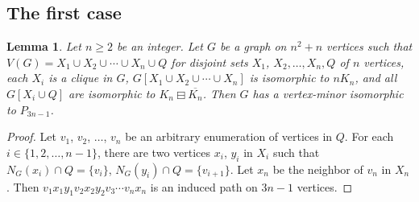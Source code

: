 \documentclass[11pt]{article}
\newtheorem{lemma}[theorem]{Lemma}
\newcommand\mat{\boxminus}
\def\S_#1{\overline{K_{#1}}}
\begin{document}
      \subsection{The first case}\label{subsec:starmatching}
      \begin{lemma}\label{lem:first1}
        Let $n\ge 2$ be an integer.
        Let $G$ be a graph on $n^2+n$ vertices such that 
        $V(G)=X_1\cup X_2\cup\cdots \cup X_n\cup Q$
        for disjoint sets $X_1$, $X_2,\ldots, X_n,Q$ of $n$ vertices,
        each $X_i$ is a clique in $G$,
        $G[X_1\cup X_2\cup \cdots \cup X_n]$ is isomorphic to $nK_n$,
        and all $G[X_i\cup Q]$ are isomorphic to  $K_n\mat \S_n$.
        Then $G$ has a vertex-minor isomorphic to $P_{3n-1}$.
      \end{lemma}
      \begin{proof}
        Let $v_1$, $v_2$, $\ldots$, $v_n$ be an arbitrary enumeration of vertices in $Q$.
        For each $i\in\{1,2,\ldots,n-1\}$, there are two vertices $x_i$, $y_i$ in $X_i$ such that
        $N_G(x_i)\cap Q=\{v_i\}$, $N_G(y_i)\cap Q=\{v_{i+1}\}$.
        Let $x_n$ be the neighbor of $v_n$ in $X_n$.
        Then $v_1x_1y_1v_2x_2y_2v_3\cdots v_nx_n$ is an induced path on $3n-1$ vertices.
      \end{proof}
\end{document}
